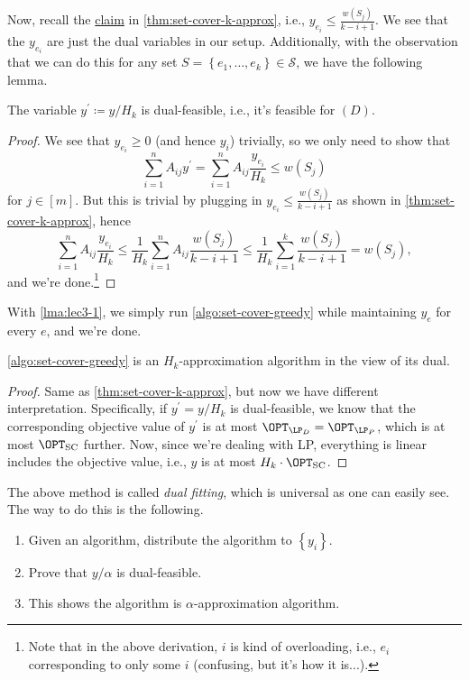 Now, recall the \hyperref[clm:set-cover-cost]{claim} in \autoref{thm:set-cover-k-approx}, i.e., \(y_{e_i} \leq \frac{w(S_{j})}{k - i + 1}\). We see that the \(y_{e_i} \) are just the dual variables in our setup. Additionally, with the observation that we can do this for any set \(S = \left\{ e_1, \dots , e_k\right\} \in \mathcal{S}\), we have the following lemma.
\begin{lemma}\label{lma:lec3-1}
	The variable \(y^\prime \coloneqq y/H_k\) is dual-feasible, i.e., it's feasible for \((D)\).
\end{lemma}
\begin{proof}
	We see that \(y_{e_i} \geq 0\) (and hence \(y_i\)) trivially, so we only need to show that
	\[
		\sum_{i=1}^{n} A_{ij}y^\prime = \sum_{i=1}^{n} A_{ij}\frac{y_{e_i}}{H_k} \leq w(S_{j})
	\]
	for \(j\in [m]\). But this is trivial by plugging in \(y_{e_i} \leq \frac{w(S_j)}{k - i + 1}\) as shown in \autoref{thm:set-cover-k-approx}, hence
	\[
		\sum_{i=1}^{n} A_{ij} \frac{y_{e_i} }{H_k} \leq \frac{1}{H_k}\sum_{i=1}^{n} A_{ij} \frac{w(S_j) }{k - i + 1} \leq \frac{1}{H_k}\sum_{i=1}^{k} \frac{w(S_j)}{k - i + 1} = w(S_j),
	\]
	and we're done.\footnote{Note that in the above derivation, \(i\) is kind of overloading, i.e., \(e_i\) corresponding to only some \(i\) (confusing, but it's how it is...).}
\end{proof}

With \autoref{lma:lec3-1}, we simply run \autoref{algo:set-cover-greedy} while maintaining \(y_e\) for every \(e\), and we're done.

\begin{theorem}
	\autoref{algo:set-cover-greedy} is an \(H_k\)-approximation algorithm in the view of its dual.
\end{theorem}
\begin{proof}
	Same as \autoref{thm:set-cover-k-approx}, but now we have different interpretation. Specifically, if \(y^\prime = y / H_k\) is dual-feasible, we know that the corresponding objective value of \(y^\prime \) is at most \(\OPT_{\LP_D} = \OPT_{\LP_P}\), which is at most \(\OPT_{\mathrm{SC}}\) further. Now, since we're dealing with LP, everything is linear includes the objective value, i.e., \(y\) is at most \(H_k\cdot \OPT_{\mathrm{SC}}\).
\end{proof}

\begin{remark}\label{rmk:dual-fitting}
	The above method is called \emph{dual fitting}, which is universal as one can easily see. The way to do this is the following.
	\begin{enumerate}
		\item Given an algorithm, distribute the algorithm to \(\left\{ y_i \right\}\).
		\item Prove that \(y / \alpha \) is dual-feasible.
		\item This shows the algorithm is \(\alpha\)-approximation algorithm.
	\end{enumerate}
\end{remark}

